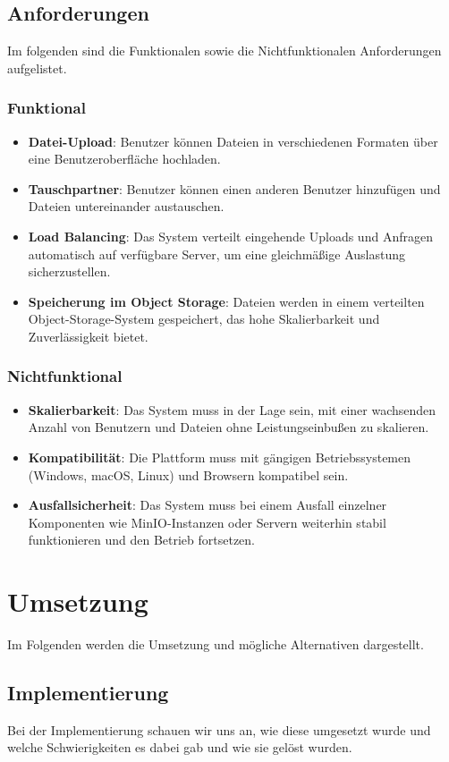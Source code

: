\documentclass[12pt]{report}
\begin{document}
	\section{Anforderungen}
		Im folgenden sind die Funktionalen sowie die Nichtfunktionalen Anforderungen aufgelistet.
		\subsection{Funktional}
			\begin{itemize}
				\item \textbf{Datei-Upload}: Benutzer können Dateien in verschiedenen Formaten über eine Benutzeroberfläche hochladen.
				\item \textbf{Tauschpartner}: Benutzer können einen anderen Benutzer hinzufügen und Dateien untereinander austauschen.
				\item \textbf{Load Balancing}: Das System verteilt eingehende Uploads und Anfragen automatisch auf verfügbare Server, um eine gleichmäßige Auslastung sicherzustellen.
				\item \textbf{Speicherung im Object Storage}: Dateien werden in einem verteilten Object-Storage-System gespeichert, das hohe Skalierbarkeit und Zuverlässigkeit bietet.
			\end{itemize}
		\subsection{Nichtfunktional}
			\begin{itemize}
				\item \textbf{Skalierbarkeit}: Das System muss in der Lage sein, mit einer wachsenden Anzahl von Benutzern und Dateien ohne Leistungseinbußen zu skalieren.
				\item \textbf{Kompatibilität}: Die Plattform muss mit gängigen Betriebssystemen (Windows, macOS, Linux) und Browsern kompatibel sein.
				\item \textbf{Ausfallsicherheit}: Das System muss bei einem Ausfall einzelner Komponenten wie MinIO-Instanzen oder Servern weiterhin stabil funktionieren und den Betrieb fortsetzen.
			\end{itemize}

\chapter{Umsetzung}
	Im Folgenden werden die Umsetzung und mögliche Alternativen dargestellt.
	\section{Implementierung}
		Bei der Implementierung schauen wir uns an, wie diese umgesetzt wurde und welche Schwierigkeiten es dabei gab und wie sie gelöst wurden.
\end{document}
